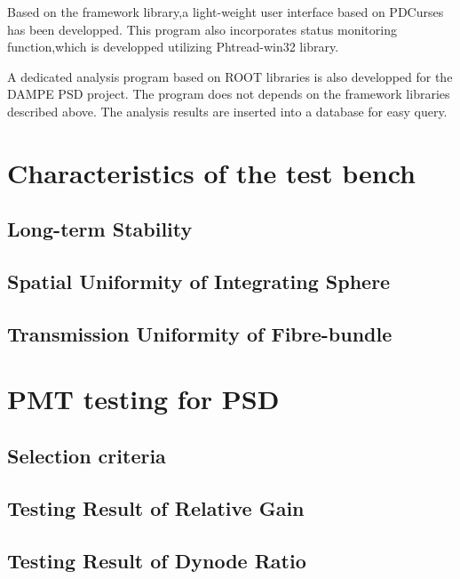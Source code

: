 \documentclass[preprint,5p,times]{elsarticle}
\begin{document}
Based on the framework library,a light-weight user interface based on PDCurses\cite{pdcurses} has been developped.
This program also incorporates status monitoring function,which is developped utilizing Phtread-win32 library\cite{pthread_win32}.

A dedicated analysis program based on ROOT libraries is also developped for the DAMPE PSD project.
The program does not depends on the framework libraries described above.
The analysis results are inserted into a database for easy query.
\section{Characteristics of the test bench}
\label{sec:char_testbench}

\subsection{Long-term Stability}
\label{sec:longterm_stability}

\subsection{Spatial Uniformity of Integrating Sphere}
\label{sec:spatialuniformity_insph}

\subsection{Transmission Uniformity of Fibre-bundle}
\label{sec:transuniformity_fibre}

\section{PMT testing for PSD}
\label{sec:pmt_test}

\subsection{Selection criteria}
\label{sec:selection}

\subsection{Testing Result of Relative Gain}
\label{sec:relative_gain}

\subsection{Testing Result of Dynode Ratio}
\label{sec:dynode_ratio}
\end{document}
